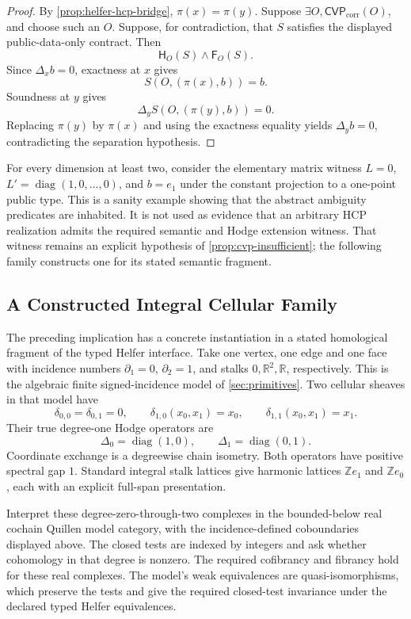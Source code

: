 \begin{proof}
  By \cref{prop:helfer-hcp-bridge},
  \(\pi(x)=\pi(y)\). Suppose
  \(\exists O,\mathsf{CVP}_{\mathrm{corr}}(O)\), and choose such an \(O\).
  Suppose, for contradiction, that \(S\) satisfies the displayed
  public-data-only contract. Then
  \[
    \mathsf H_O(S)\wedge\mathsf F_O(S).
  \]
  Since \(\Delta_xb=0\), exactness at \(x\) gives
  \[
    S(O,(\pi(x),b))=b.
  \]
  Soundness at \(y\) gives
  \[
    \Delta_yS(O,(\pi(y),b))=0.
  \]
  Replacing \(\pi(y)\) by \(\pi(x)\) and using the exactness equality yields
  \(\Delta_yb=0\), contradicting the separation hypothesis.
\end{proof}

For every dimension at least two, consider the elementary matrix witness \(L=0\),
\(L'=\operatorname{diag}(1,0,\ldots,0)\), and \(b=e_1\) under the constant
projection to a one-point public type. This is a sanity example showing that
the abstract ambiguity predicates are inhabited. It is not used as evidence
that an arbitrary HCP realization admits the required semantic and Hodge
extension witness. That witness remains an explicit hypothesis of
\cref{prop:cvp-insufficient}; the following family constructs one for its
stated semantic fragment.

\subsection{A Constructed Integral Cellular Family}

The preceding implication has a concrete instantiation in a stated
homological fragment of the typed Helfer interface. Take one vertex, one edge
and one face with incidence numbers \(\partial_1=0\), \(\partial_2=1\),
and stalks \(0,\mathbb R^2,\mathbb R\), respectively. This is the algebraic
finite signed-incidence model of \cref{sec:primitives}. Two cellular
sheaves in that model have
\[
  \delta_{0,0}=\delta_{0,1}=0,
  \qquad
  \delta_{1,0}(x_0,x_1)=x_0,
  \qquad
  \delta_{1,1}(x_0,x_1)=x_1.
\]
Their true degree-one Hodge operators are
\[
  \Delta_0=\operatorname{diag}(1,0),
  \qquad
  \Delta_1=\operatorname{diag}(0,1).
\]
Coordinate exchange is a degreewise chain isometry. Both operators have
positive spectral gap \(1\). Standard integral stalk lattices give harmonic
lattices \(\mathbb Z e_1\) and \(\mathbb Z e_0\), each with an explicit
full-span presentation.

Interpret these degree-zero-through-two complexes in the bounded-below
real cochain Quillen model category, with the incidence-defined coboundaries
displayed above. The closed tests are indexed by integers and ask whether
cohomology in that degree is nonzero. The required cofibrancy and fibrancy
hold for these real complexes. The model's weak equivalences are
quasi-isomorphisms, which preserve the tests and give the required
closed-test invariance under the declared typed Helfer equivalences.

